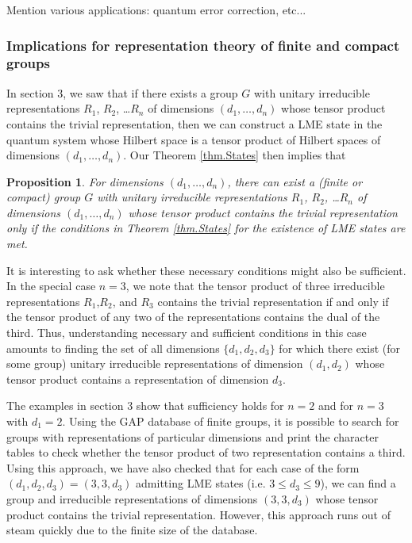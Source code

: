 \documentclass[12pt]{article}
\newtheorem{proposition}[theorem]{Proposition}
\theoremstyle{definition}
\begin{document}
Mention various applications: quantum error correction, etc...

\subsubsection*{Implications for representation theory of finite and compact groups}

In section 3, we saw that if there exists a group $G$ with unitary irreducible representations $R_1$, $R_2$, \dots $R_n$  of dimensions $(d_1, \dots, d_n)$ whose tensor product contains the trivial representation, then we can construct a LME state in the quantum system whose Hilbert space is a tensor product of Hilbert spaces of dimensions $(d_1, \dots, d_n)$. Our Theorem \ref{thm.States} then implies that
\begin{proposition}
For dimensions $(d_1, \dots, d_n)$, there can exist a (finite or compact) group $G$ with unitary irreducible representations $R_1$, $R_2$, \dots $R_n$  of dimensions $(d_1, \dots, d_n)$ whose tensor product contains the trivial representation only if the conditions in Theorem \ref{thm.States} for the existence of LME states are met.
\end{proposition}
It is interesting to ask whether these necessary conditions might also be sufficient. In the special case $n=3$, we note that the tensor product of three irreducible representations $R_1$,$R_2$, and $R_3$ contains the trivial representation if and only if the tensor product of any two of the representations contains the dual of the third. Thus, understanding necessary and sufficient conditions in this case amounts to finding the set of all dimensions $\{d_1, d_2, d_3\}$ for which there exist (for some group) unitary irreducible representations  of dimension $(d_1,d_2)$ whose tensor product contains a representation of dimension $d_3$.

The examples in section 3 show that sufficiency holds for $n=2$ and for $n=3$ with $d_1 = 2$. Using the GAP database of finite groups, it is possible to search for groups with representations of particular dimensions and print the character tables to check whether the tensor product of two representation contains a third. Using this approach, we have also checked that for each case of the form $(d_1,d_2,d_3) = (3,3,d_3)$ admitting LME states (i.e. $3 \le d_3 \le 9$), we can find a group and irreducible representations of dimensions $(3,3,d_3)$ whose tensor product contains the trivial representation. However, this approach runs out of steam quickly due to the finite size of the database.
\end{document}

